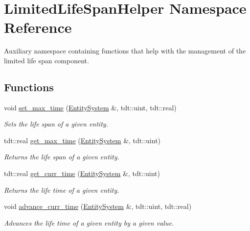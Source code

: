 \hypertarget{namespace_limited_life_span_helper}{}\section{Limited\+Life\+Span\+Helper Namespace Reference}
\label{namespace_limited_life_span_helper}


Auxiliary namespace containing functions that help with the management of the limited life span component.  


\subsection*{Functions}
\begin{DoxyCompactItemize}
\item 
void \hyperlink{namespace_limited_life_span_helper_a6a4cf5c304e206018537529767a03a72}{set\+\_\+max\+\_\+time} (\hyperlink{class_entity_system}{Entity\+System} \&, tdt\+::uint, tdt\+::real)
\begin{DoxyCompactList}\small\item\em Sets the life span of a given entity. \end{DoxyCompactList}\item 
tdt\+::real \hyperlink{namespace_limited_life_span_helper_aa9ec80745418ee87b6b7578147592d40}{get\+\_\+max\+\_\+time} (\hyperlink{class_entity_system}{Entity\+System} \&, tdt\+::uint)
\begin{DoxyCompactList}\small\item\em Returns the life span of a given entity. \end{DoxyCompactList}\item 
tdt\+::real \hyperlink{namespace_limited_life_span_helper_a06f5c0b71fdf60725d71e43b6c91ed5e}{get\+\_\+curr\+\_\+time} (\hyperlink{class_entity_system}{Entity\+System} \&, tdt\+::uint)
\begin{DoxyCompactList}\small\item\em Returns the life time of a given entity. \end{DoxyCompactList}\item 
void \hyperlink{namespace_limited_life_span_helper_a61d110ee44e3912dc1468e3ef55b78ea}{advance\+\_\+curr\+\_\+time} (\hyperlink{class_entity_system}{Entity\+System} \&, tdt\+::uint, tdt\+::real)
\begin{DoxyCompactList}\small\item\em Advances the life time of a given entity by a given value. \end{DoxyCompactList}\end{DoxyCompactItemize}


